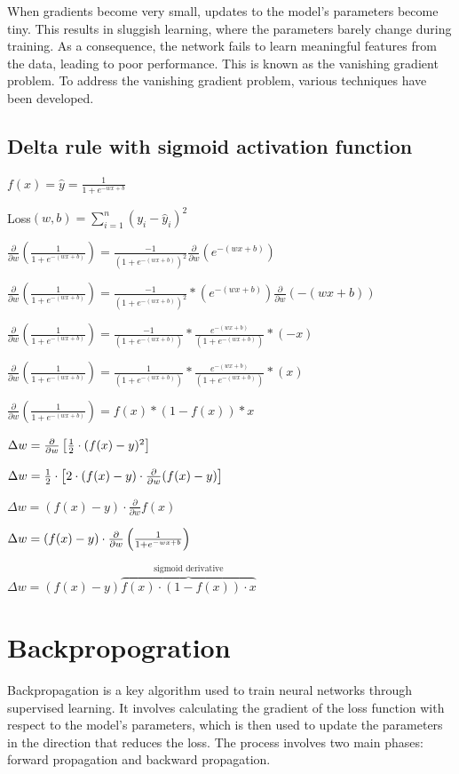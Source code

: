 \documentclass{report}
\begin{document}
When gradients become very small, updates to the model's parameters become tiny. This results in sluggish learning, where the parameters barely change during training. As a consequence, the network fails to learn meaningful features from the data, leading to poor performance. This is known as the vanishing gradient problem. To address the vanishing gradient problem, various techniques have been developed.

\subsection{Delta rule with sigmoid activation function}
$f(x) = \hat{y} = \frac{1}{1+e^{-{wx+b}}}$

Loss$(w,b) = \sum^n_{i=1}(y_i - \hat{y}_i)^2$

$\frac{\partial}{\partial w}\left(\frac{1}{1+e^{-(w x+b)}}\right) =\frac{-1}{\left(1+e^{-(w x+b)}\right)^2} \frac{\partial}{\partial w}\left(e^{-(w x+b)}\right)$

$\frac{\partial}{\partial w}\left(\frac{1}{1+e^{-(w x+b)}}\right) =\frac{-1}{\left(1+e^{-(w x+b)}\right)^2} *\left(e^{-(w x+b)}\right) \frac{\partial}{\partial w}(-(w x+b))$

$\frac{\partial}{\partial w}\left(\frac{1}{1+e^{-(w x+b)}}\right) =\frac{-1}{\left(1+e^{-(w x+b)}\right)} * \frac{e^{-(w x+b)}}{\left(1+e^{-(w x+b)}\right)} *(-x)$

$\frac{\partial}{\partial w}\left(\frac{1}{1+e^{-(w x+b)}}\right) =\frac{1}{\left(1+e^{-(w x+b)}\right)} * \frac{e^{-(w x+b)}}{\left(1+e^{-(w x+b)}\right)} *(x)$

$\frac{\partial}{\partial w}\left(\frac{1}{1+e^{-(w x+b)}}\right) =f(x) *(1-f(x)) * x$

$\Delta w = \frac{\partial}{\partial w}\left[ \frac{1}{2} \cdot (f(x) - y)^2\right]$

$\Delta w = \frac{1}{2} \cdot \left[2 \cdot (f(x) - y) \cdot \frac{\partial}{\partial w}(f(x) - y)\right]$

$\Delta w = (f(x) - y) \cdot \frac{\partial}{\partial w}f(x)$

$\Delta w = (f(x) - y) \cdot \frac{\partial}{\partial w}\left(\frac{1}{1 + e^{-wx+b}}\right)$

$\Delta w = (f(x)-y) \overbrace{f(x) \cdot (1-f(x)) \cdot x}^\textrm{sigmoid derivative}$

\section{Backpropogration}
Backpropagation is a key algorithm used to train neural networks through supervised learning. It involves calculating the gradient of the loss function with respect to the model's parameters, which is then used to update the parameters in the direction that reduces the loss. The process involves two main phases: forward propagation and backward propagation.
    
\end{document}
